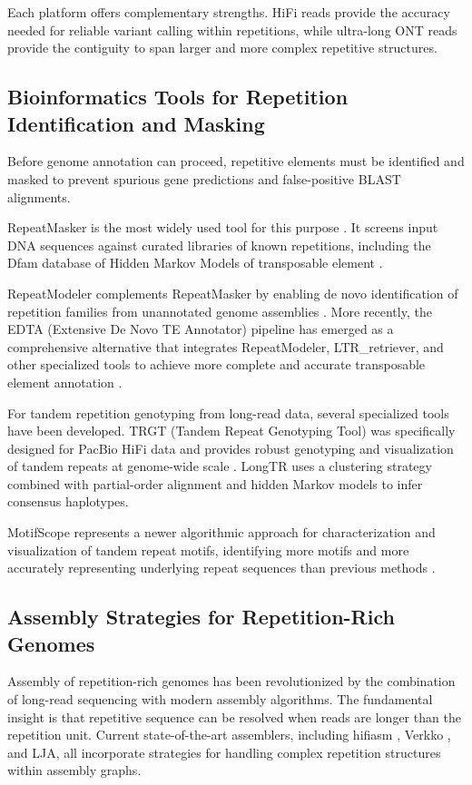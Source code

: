 Each platform offers complementary strengths. HiFi reads provide the accuracy needed for reliable variant calling within repetitions, while ultra-long ONT reads provide the contiguity to span larger and more complex repetitive structures.

\subsection{Bioinformatics Tools for Repetition Identification and Masking}

Before genome annotation can proceed, repetitive elements must be identified and masked to prevent spurious gene predictions and false-positive BLAST alignments.

RepeatMasker is the most widely used tool for this purpose \parencite{smit2013}. It screens input DNA sequences against curated libraries of known repetitions, including the Dfam database of Hidden Markov Models of transposable element \parencite{storer2021}.

RepeatModeler complements RepeatMasker by enabling de novo identification of repetition families from unannotated genome assemblies \parencite{flynn2020}. More recently, the EDTA (Extensive De Novo TE Annotator) pipeline has emerged as a comprehensive alternative that integrates RepeatModeler, LTR\_retriever, and other specialized tools to achieve more complete and accurate transposable element annotation \parencite{ou2019}.

For tandem repetition genotyping from long-read data, several specialized tools have been developed. TRGT (Tandem Repeat Genotyping Tool) was specifically designed for PacBio HiFi data and provides robust genotyping and visualization of tandem repeats at genome-wide scale \parencite{dolzhenko2024}. LongTR uses a clustering strategy combined with partial-order alignment and hidden Markov models to infer consensus haplotypes.

MotifScope represents a newer algorithmic approach for characterization and visualization of tandem repeat motifs, identifying more motifs and more accurately representing underlying repeat sequences than previous methods \parencite{zhang2025}.

\subsection{Assembly Strategies for Repetition-Rich Genomes}

Assembly of repetition-rich genomes has been revolutionized by the combination of long-read sequencing with modern assembly algorithms. The fundamental insight is that repetitive sequence can be resolved when reads are longer than the repetition unit. Current state-of-the-art assemblers, including hifiasm \parencite{cheng2021}, Verkko \parencite{rautiainen2023}, and LJA, all incorporate strategies for handling complex repetition structures within assembly graphs.

